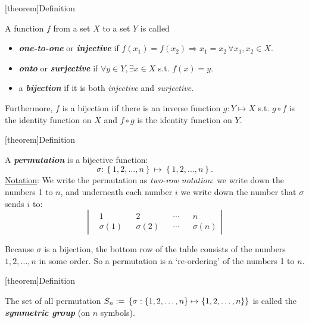 \documentclass[12pt]{report}
\theoremstyle{definition}
\begin{document}
[theorem]{Definition}
\begin{function classification}
    A function $f$ from a set $X$ to a set $Y$ is called
    \begin{itemize}
            \item \textbf{\emph{one-to-one}} or \textbf{\emph{injective}} 
                if $f(x_1) = f(x_2) \Rightarrow{}x_1 = x_2 \,\forall x_1, x_2 \in{}X$.
                
            \item \textbf{\emph{onto}} or \textbf{\emph{surjective}} if
                $\forall y \in{}Y, \exists x \in{}X$ s.t. $f(x) = y$.

            \item a \textbf{\emph{bijection}} if it is both \emph{injective} and \emph{surjective}.
    \end{itemize}
\end{function classification}

Furthermore, $f$ is a bijection iif there is an inverse function $g: Y \mapsto X$
s.t. $g \circ f$ is the identity function on $X$ and $f \circ g$ is the identity function on $Y$.


[theorem]{Definition}
\begin{permutation}
    A \textbf{\emph{permutation}} is a bijective function:\[
        \sigma : \left\{1, 2, \ldots, n\right\} \mapsto \left\{1, 2, \ldots, n\right\}.
    \]
    \underline{Notation}: We write the permutation as \emph{two-row notation}:
    we write down the numbers 1 to $n$, and underneath each number $i$
    we write down the number that $\sigma$ sends $i$ to:\[
        \left|
        \begin{align*}
            & 1 && 2 && \cdots && n \\
            & \sigma(1) && \sigma(2) && \cdots && \sigma(n)
        \end{align*}
        \right| 
    \]
\end{permutation}

    Because $\sigma$ is a bijection, the bottom row of the table consists of the numbers
    $1, 2, \ldots, n$ in some order. So a permutation is a `re-ordering' of the numbers 1 to $n$.

[theorem]{Definition}
\begin{symmetric group}
    The set of all permutation $S_n := \\\left\{ \sigma : 
    \left\{1, 2, \ldots, n\right\}  \mapsto \left\{1, 2, \ldots, n\right\} \right\} $
    is called the \textbf{\emph{symmetric group}} (on $n$ symbols).
\end{symmetric group}
\end{document}
